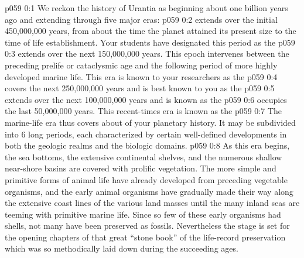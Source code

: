 \author{Life Carrier}
\vs p059 0:1 We reckon the history of Urantia as beginning about one billion years ago and extending through five major eras:
\vs p059 0:2 \bibnobreakspace {} extends over the initial 450,000,000 years, from about the time the planet attained its present size to the time of life establishment. Your students have designated this period as the 
\vs p059 0:3 \bibnobreakspace {} extends over the next 150,000,000 years. This epoch intervenes between the preceding prelife or cataclysmic age and the following period of more highly developed marine life. This era is known to your researchers as the 
\vs p059 0:4 \bibnobreakspace {} covers the next 250,000,000 years and is best known to you as the 
\vs p059 0:5 \bibnobreakspace {} extends over the next 100,000,000 years and is known as the 
\vs p059 0:6 \bibnobreakspace {} occupies the last 50,000,000 years. This recent\hyp{}times era is known as the 
\vs p059 0:7 \pc The marine\hyp{}life era thus covers about  of your planetary history. It may be subdivided into 6 long periods, each characterized by certain well\hyp{}defined developments in both the geologic realms and the biologic domains.
\vs p059 0:8 As this era begins, the sea bottoms, the extensive continental shelves, and the numerous shallow near\hyp{}shore basins are covered with prolific vegetation. The more simple and primitive forms of animal life have already developed from preceding vegetable organisms, and the early animal organisms have gradually made their way along the extensive coast lines of the various land masses until the many inland seas are teeming with primitive marine life. Since so few of these early organisms had shells, not many have been preserved as fossils. Nevertheless the stage is set for the opening chapters of that great “stone book” of the life\hyp{}record preservation which was so methodically laid down during the succeeding ages.
